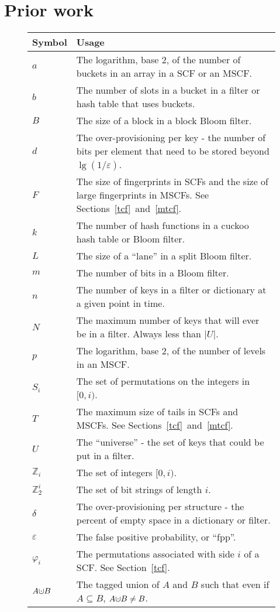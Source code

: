 \documentclass[letterpaper,twocolumn,10pt]{article}
\newcommand{\ints}{\mathbb{Z}}
\newcommand{\dotcup}{\ensuremath{\mathaccent\cdot\cup}}
\newcommand{\TCF}{SCF}
\newcommand{\MTCF}{MSCF}
\newcommand{\TCF}{TCF}
\newcommand{\MTCF}{MTCF}
\begin{document}

\section{Prior work}

\begin{figure}[t!]
\begin{tabular}{|m{0.5in}|m{2.5in}|}
\hline {\bf Symbol} & {\bf Usage} \\
\hline $a$ & The logarithm, base 2, of the number of buckets in an array in a \TCF{} or an \MTCF{}. \\
\hline $b$ & The number of slots in a bucket in a filter or hash table that uses buckets. \\
\hline $B$ & The size of a block in a block Bloom filter. \\
\hline $d$ & The over-provisioning per key - the number of bits per element that need to be stored beyond $\lg (1/\varepsilon)$. \\
\hline $F$ & The size of fingerprints in \TCF{}s and the size of large fingerprints in \MTCF{}s.
See Sections~\ref{tcf}~and~\ref{mtcf}. \\
\hline $k$ & The number of hash functions in a cuckoo hash table or Bloom filter. \\
\hline $L$ & The size of a ``lane'' in a split Bloom filter. \\
\hline $m$ & The number of bits in a Bloom filter. \\
\hline $n$ & The number of keys in a filter or dictionary at a given point in time. \\
\hline $N$ & The maximum number of keys that will ever be in a filter.
Always less than $|U|$. \\
\hline $p$ & The logarithm, base 2, of the number of levels in an \MTCF{}. \\
\hline $S_i$ & The set of permutations on the integers in $[0, i)$. \\
\hline $T$ & The maximum size of tails in \TCF{}s and \MTCF{}s.
See Sections~\ref{tcf}~and~\ref{mtcf}. \\
\hline $U$ & The ``universe'' - the set of keys that could be put in a filter. \\
\hline $\ints_i$ & The set of integers $[0, i)$. \\
\hline $\ints_2^i$ & The set of bit strings of length $i$. \\
\hline $\delta$ & The over-provisioning per structure - the percent of empty space in a dictionary or filter. \\
\hline $\varepsilon$ & The false positive probability, or ``fpp''. \\
\hline $\varphi_i$ & The permutations associated with side $i$ of a \TCF{}.
See Section~\ref{tcf}. \\
\hline $A \dotcup B$ & The tagged union of $A$ and $B$ such that even if $A \subseteq B$, $A \dotcup B \ne B$. \\
\hline
\end{tabular}
\end{figure}
\end{document}
